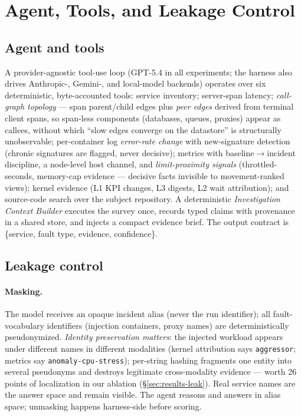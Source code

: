 \section{Agent, Tools, and Leakage Control}
\label{sec:system}

\subsection{Agent and tools}
A provider-agnostic tool-use loop (GPT-5.4 in all experiments; the harness also drives
Anthropic-, Gemini-, and local-model backends) operates over six deterministic,
byte-accounted tools: service inventory; server-span latency; \emph{call-graph
topology} --- span parent/child edges plus \emph{peer edges} derived from terminal
client spans, so span-less components (databases, queues, proxies) appear as callees,
without which ``slow edges converge on the datastore'' is structurally unobservable;
per-container log \emph{error-rate change} with new-signature detection (chronic
signatures are flagged, never decisive); metrics with baseline$\rightarrow$incident
discipline, a node-level host channel, and \emph{limit-proximity signals}
(throttled-seconds, memory-cap evidence --- decisive facts invisible to
movement-ranked views); kernel evidence (L1 KPI changes, L3 digests, L2 wait
attribution); and source-code search over the subject repository. A deterministic
\emph{Investigation Context Builder} executes the survey once, records typed claims
with provenance in a shared store, and injects a compact evidence brief. The output
contract is \{service, fault type, evidence, confidence\}.

\subsection{Leakage control}
\label{sec:leakage}
\paragraph{Masking.} The model receives an opaque incident alias (never the run
identifier); all fault-vocabulary identifiers (injection containers, proxy names) are
deterministically pseudonymized. \emph{Identity preservation matters}: the injected
workload appears under different names in different modalities (kernel attribution
says \texttt{aggressor}; metrics say \texttt{anomaly-cpu-stress}); per-string hashing
fragments one entity into several pseudonyms and destroys legitimate cross-modality
evidence --- worth 26 points of localization in our ablation (\S\ref{sec:results-leak}).
Real service names are the answer space and remain visible. The agent reasons and
answers in alias space; unmasking happens harness-side before scoring.

